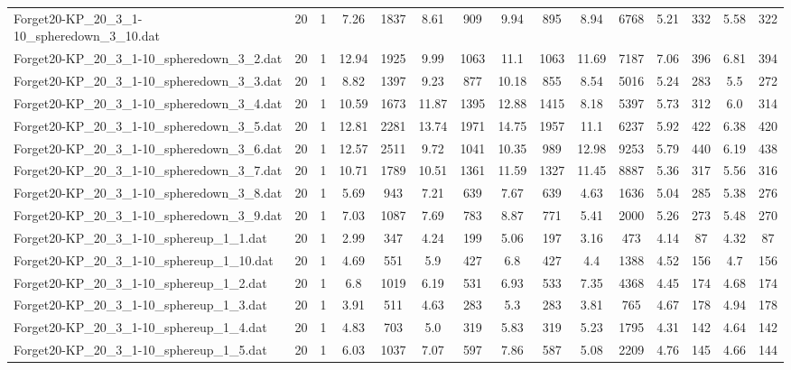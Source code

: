 \begin{table}[!ht]
{\begin{tabular}{lcccccccccccccc}
Forget20-KP\_20\_3\_1-10\_spheredown\_3\_10.dat & 20 & 1 & 7.26 & 1837 & 8.61 & 909 & 9.94 & 895 & 8.94 & 6768 & 5.21 & 332 & 5.58 & 322 \\
Forget20-KP\_20\_3\_1-10\_spheredown\_3\_2.dat & 20 & 1 & 12.94 & 1925 & 9.99 & 1063 & 11.1 & 1063 & 11.69 & 7187 & 7.06 & 396 & 6.81 & 394 \\
Forget20-KP\_20\_3\_1-10\_spheredown\_3\_3.dat & 20 & 1 & 8.82 & 1397 & 9.23 & 877 & 10.18 & 855 & 8.54 & 5016 & 5.24 & 283 & 5.5 & 272 \\
Forget20-KP\_20\_3\_1-10\_spheredown\_3\_4.dat & 20 & 1 & 10.59 & 1673 & 11.87 & 1395 & 12.88 & 1415 & 8.18 & 5397 & 5.73 & 312 & 6.0 & 314 \\
Forget20-KP\_20\_3\_1-10\_spheredown\_3\_5.dat & 20 & 1 & 12.81 & 2281 & 13.74 & 1971 & 14.75 & 1957 & 11.1 & 6237 & 5.92 & 422 & 6.38 & 420 \\
Forget20-KP\_20\_3\_1-10\_spheredown\_3\_6.dat & 20 & 1 & 12.57 & 2511 & 9.72 & 1041 & 10.35 & 989 & 12.98 & 9253 & 5.79 & 440 & 6.19 & 438 \\
Forget20-KP\_20\_3\_1-10\_spheredown\_3\_7.dat & 20 & 1 & 10.71 & 1789 & 10.51 & 1361 & 11.59 & 1327 & 11.45 & 8887 & 5.36 & 317 & 5.56 & 316 \\
Forget20-KP\_20\_3\_1-10\_spheredown\_3\_8.dat & 20 & 1 & 5.69 & 943 & 7.21 & 639 & 7.67 & 639 & 4.63 & 1636 & 5.04 & 285 & 5.38 & 276 \\
Forget20-KP\_20\_3\_1-10\_spheredown\_3\_9.dat & 20 & 1 & 7.03 & 1087 & 7.69 & 783 & 8.87 & 771 & 5.41 & 2000 & 5.26 & 273 & 5.48 & 270 \\
Forget20-KP\_20\_3\_1-10\_sphereup\_1\_1.dat & 20 & 1 & 2.99 & 347 & 4.24 & 199 & 5.06 & 197 & 3.16 & 473 & 4.14 & 87 & 4.32 & 87 \\
Forget20-KP\_20\_3\_1-10\_sphereup\_1\_10.dat & 20 & 1 & 4.69 & 551 & 5.9 & 427 & 6.8 & 427 & 4.4 & 1388 & 4.52 & 156 & 4.7 & 156 \\
Forget20-KP\_20\_3\_1-10\_sphereup\_1\_2.dat & 20 & 1 & 6.8 & 1019 & 6.19 & 531 & 6.93 & 533 & 7.35 & 4368 & 4.45 & 174 & 4.68 & 174 \\
Forget20-KP\_20\_3\_1-10\_sphereup\_1\_3.dat & 20 & 1 & 3.91 & 511 & 4.63 & 283 & 5.3 & 283 & 3.81 & 765 & 4.67 & 178 & 4.94 & 178 \\
Forget20-KP\_20\_3\_1-10\_sphereup\_1\_4.dat & 20 & 1 & 4.83 & 703 & 5.0 & 319 & 5.83 & 319 & 5.23 & 1795 & 4.31 & 142 & 4.64 & 142 \\
Forget20-KP\_20\_3\_1-10\_sphereup\_1\_5.dat & 20 & 1 & 6.03 & 1037 & 7.07 & 597 & 7.86 & 587 & 5.08 & 2209 & 4.76 & 145 & 4.66 & 144 \\

\end{tabular}}
\end{table}
